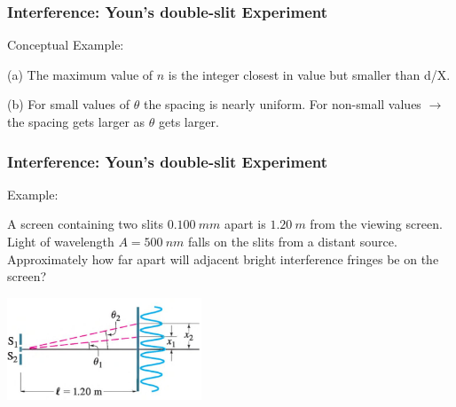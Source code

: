 \documentclass[]{beamer}
\begin{document}
\begin{frame}

\frametitle{Interference: Youn's double-slit Experiment}

Conceptual Example:
\vspace{3mm}

(a) The maximum value of $n$ is the integer closest in value but smaller than d/X.
\vspace{3mm}
\pause

(b) For small values of $\theta$ the spacing is nearly uniform. For non-small values $\rightarrow$ the spacing gets larger as  $\theta$ gets larger.

  \end{frame}




\begin{frame}

\frametitle{Interference: Youn's double-slit Experiment}

Example:
\vspace{3mm}

A screen containing two slits $0.100~mm$ apart is $1.20~m$ from the viewing screen. Light of
wavelength $A = 500~nm$ falls on the slits from a distant source. Approximately
how far apart will adjacent bright interference fringes be on the screen?


  \begin{center}
  \includegraphics[height=1.2in]{images5/intexample.jpg}
\end{center}






  \end{frame}



\end{document}
